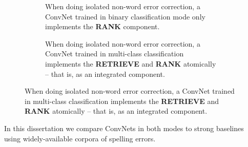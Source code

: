 \begin{figure}
\centering
\captionsetup[subfigure]{justification=centering}
    \begin{subfigure}{\textwidth}
    \centering
    \caption{When doing isolated non-word error correction, a ConvNet trained in binary classification mode only implements the \textbf{RANK} component.}
    \label{fig:IsolatedNonWordErrorCorrectionBinary}
    \end{subfigure}
    
    \begin{subfigure}{\textwidth}
    \centering
    \caption{When doing isolated non-word error correction, a ConvNet trained in multi-class classification implements the \textbf{RETRIEVE} and \textbf{RANK} atomically -- that is, as an integrated component.}
    \label{fig:IsolatedNonWordErrorCorrectionMulticlass}
    \end{subfigure}
\end{figure}

In this dissertation we compare ConvNets in both modes to strong baselines using widely-available corpora of spelling errors.  


